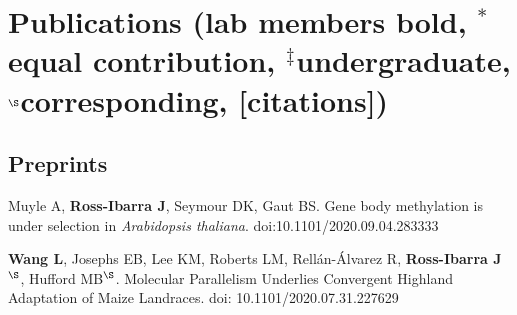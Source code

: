 \documentclass[letterpaper,10pt]{article}
\renewenvironment{itemize}{
  \begin{list}{}{
    \setlength{\leftmargin}{1.5em}
  }
}{
  \end{list}
}
\begin{document}
\section*{Publications {\small(lab members bold, $^*$equal contribution, $^\ddagger$undergraduate, $^\S$corresponding, [citations])}}


\subsection*{Preprints}
\begin{itemize}





\item Muyle A, \textbf{Ross-Ibarra J}, Seymour DK, Gaut BS. Gene body methylation is under selection in \textit{Arabidopsis thaliana}. doi:10.1101/2020.09.04.283333

\item \textbf{Wang L}, Josephs EB, Lee KM, Roberts LM, Rell\'{a}n-\'{A}lvarez R, \textbf{Ross-Ibarra J}$^\S$, Hufford MB$^\S$. Molecular Parallelism Underlies Convergent Highland Adaptation of Maize Landraces. doi: 10.1101/2020.07.31.227629


\end{itemize}
\end{document}
